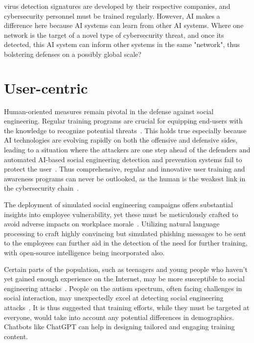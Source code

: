 virus detection signatures are developed by their respective companies, and cybersecurity personnel must be trained regularly. However, AI makes a difference here because AI systems can learn from other AI systems. Where one network is the target of a novel type of cybersecurity threat, and once its detected, this AI system can inform other systems in the same "network", thus bolstering defenses on a possibly global scale?


\section{User-centric}
\begin{comment}    
    - Deepfake content detection
    - Spear phishing detection
\end{comment}

Human-oriented measures remain pivotal in the defense against social engineering. Regular training programs are crucial for equipping end-users with the knowledge to recognize potential threats~\citep{hadnagy_Social_Engineering_The_Science_2018}. This holds true especially because AI technologies are evolving rapidly on both the offensive and defensive sides, leading to a situation where the attackers are one step ahead of the defenders and automated AI-based social engineering detection and prevention systems fail to protect the user~\citep{fakhouri_AI_Driven_Solutions_SE_Attacks_2024}. Thus comprehensive, regular and innovative user training and awareness programs can never be outlooked, as the human is the weakest link in the cybersecurity chain~\citep{mitnick_The_Art_of_Deception_2003}.

The deployment of simulated social engineering campaigns offers substantial insights into employee vulnerability, yet these must be meticulously crafted to avoid adverse impacts on workplace morale~\citep{mitnick_The_Art_of_Deception_2003}. Utilizing natural language processing to craft highly convincing but simulated phishing messages to be sent to the employees can further aid in the detection of the need for further training, with open-source intelligence being incorporated also.

%
%
Certain parts of the population, such as teenagers and young people who haven't yet gained enough experience on the Internet, may be more susceptible to social engineering attacks~\citep{nicholson_Investigating_Teenagers_Detect_Phishing_2020}. People on the autism spectrum, often facing challenges in social interaction, may unexpectedly excel at detecting social engineering attacks~\citep{neupane_Social_Disorders_Facilitate_SE_2018}. It is thus suggested that training efforts, while they must be targeted at everyone, would take into account any potential differences in demographics. Chatbots like ChatGPT can help in designing tailored and engaging training content.















